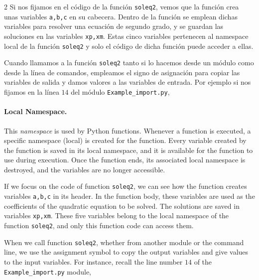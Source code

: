\begin{paracol}{2}
Si nos fijamos en el código de la función \texttt{soleq2}, vemos que la función crea unas variables \texttt{a,b,c} en su cabecera. Dentro de la función se emplean dichas variables para resolver una ecuación de segundo grado, y se guardan las soluciones en las variables \texttt{xp,xm}. Estas cinco variables pertenecen al namespace local de la función \texttt{soleq2} y solo el código de dicha función puede acceder a ellas.

Cuando llamamos a la función \texttt{soleq2} tanto si lo hacemos desde un módulo como desde la línea de comandos, empleamos el signo de asignación para copiar las variables de salida y damos valores a las variables de entrada. Por ejemplo si nos fijamos en la línea $14$ del módulo \texttt{Example_import.py},
\switchcolumn
\paragraph{Local Namespace.} This \emph{namespace} is used by Python functions. Whenever a function is executed, a specific namespace (local) is created for the function. Every variable created by the function is saved in its local namespace, and it is available for the function to use during execution. Once the function ends, its associated local namespace is destroyed, and the variables are no longer accessible.

If we focus on the code of function \texttt{soleq2}, we can see how the function creates variables \texttt{a,b,c} in its header. In the function body, these variables are used as the coefficients of the quadratic equation to be solved. The solutions are saved in variables \texttt{xp,xm}. These five variables belong to the local namespace of the function \texttt{soleq2}, and only this function code can access them. 

When we call function \texttt{soleq2}, whether from another module or the command line, we use the assignment symbol to copy the output variables and give values to the input variables. For instance, recall the line number $14$ of the \texttt{Example_import.py} module,
\end{paracol}
